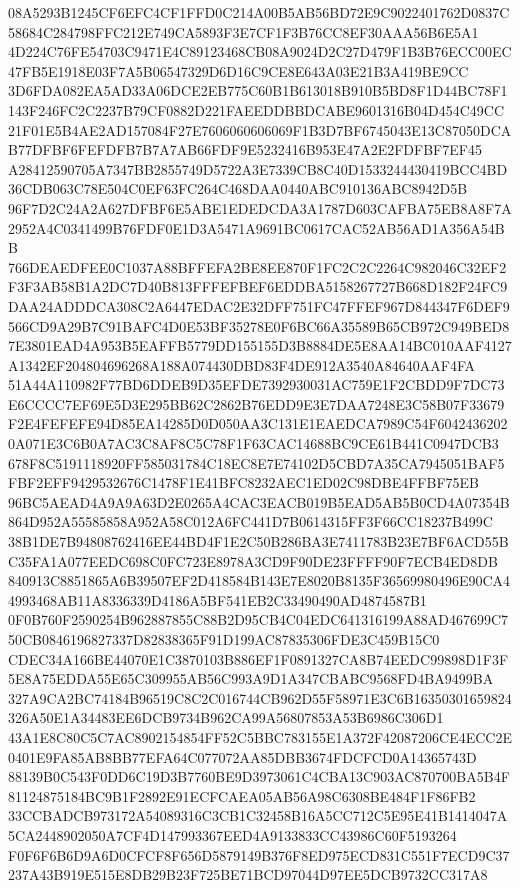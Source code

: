 \documentclass[UTF8,fontset=fandol,zihao=-4,a4paper]{ctexart}
\begin{document}
{{08A5293B1245CF6EFC4CF1FFD0C214A00B5AB56BD72E9C9022401762D0837C58684C284798FFC212E749CA5893F3E7CF1F3B76CC8EF30AAA56B6E5A1
4D224C76FE54703C9471E4C89123468CB08A9024D2C27D479F1B3B76ECC00EC47FB5E1918E03F7A5B06547329D6D16C9CE8E643A03E21B3A419BE9CC
3D6FDA082EA5AD33A06DCE2EB775C60B1B613018B910B5BD8F1D44BC78F1143F246FC2C2237B79CF0882D221FAEEDDBBDCABE9601316B04D454C49CC
21F01E5B4AE2AD157084F27E7606060606069F1B3D7BF6745043E13C87050DCAB77DFBF6FEFDFB7B7A7AB66FDF9E5232416B953E47A2E2FDFBF7EF45
A28412590705A7347BB2855749D5722A3E7339CB8C40D1533244430419BCC4BD36CDB063C78E504C0EF63FC264C468DAA0440ABC910136ABC8942D5B
96F7D2C24A2A627DFBF6E5ABE1EDEDCDA3A1787D603CAFBA75EB8A8F7A2952A4C0341499B76FDF0E1D3A5471A9691BC0617CAC52AB56AD1A356A54BB
766DEAEDFEE0C1037A88BFFEFA2BE8EE870F1FC2C2C2264C982046C32EF2F3F3AB58B1A2DC7D40B813FFFEFBEF6EDDBA5158267727B668D182F24FC9
DAA24ADDDCA308C2A6447EDAC2E32DFF751FC47FFEF967D844347F6DEF9566CD9A29B7C91BAFC4D0E53BF35278E0F6BC66A35589B65CB972C949BED8
7E3801EAD4A953B5EAFFB5779DD155155D3B8884DE5E8AA14BC010AAF4127A1342EF204804696268A188A074430DBD83F4DE912A3540A84640AAF4FA
51A44A110982F77BD6DDEB9D35EFDE7392930031AC759E1F2CBDD9F7DC73E6CCCC7EF69E5D3E295BB62C2862B76EDD9E3E7DAA7248E3C58B07F33679
F2E4FEFEFE94D85EA14285D0D050AA3C131E1EAEDCA7989C54F60424362020A071E3C6B0A7AC3C8AF8C5C78F1F63CAC14688BC9CE61B441C0947DCB3
678F8C5191118920FF585031784C18EC8E7E74102D5CBD7A35CA7945051BAF5FBF2EFF9429532676C1478F1E41BFC8232AEC1ED02C98DBE4FFBF75EB
96BC5AEAD4A9A9A63D2E0265A4CAC3EACB019B5EAD5AB5B0CD4A07354B864D952A55585858A952A58C012A6FC441D7B0614315FF3F66CC18237B499C
38B1DE7B94808762416EE44BD4F1E2C50B286BA3E7411783B23E7BF6ACD55BC35FA1A077EEDC698C0FC723E8978A3CD9F90DE23FFFF90F7ECB4ED8DB
840913C8851865A6B39507EF2D418584B143E7E8020B8135F36569980496E90CA44993468AB11A8336339D4186A5BF541EB2C33490490AD4874587B1
0F0B760F2590254B962887855C88B2D95CB4C04EDC641316199A88AD467699C750CB0846196827337D82838365F91D199AC87835306FDE3C459B15C0
CDEC34A166BE44070E1C3870103B886EF1F0891327CA8B74EEDC99898D1F3F5E8A75EDDA55E65C309955AB56C993A9D1A347CBABC9568FD4BA9499BA
327A9CA2BC74184B96519C8C2C016744CB962D55F58971E3C6B16350301659824326A50E1A34483EE6DCB9734B962CA99A56807853A53B6986C306D1
43A1E8C80C5C7AC8902154854FF52C5BBC783155E1A372F42087206CE4ECC2E0401E9FA85AB8BB77EFA64C077072AA85DBB3674FDCFCD0A14365743D
88139B0C543F0DD6C19D3B7760BE9D3973061C4CBA13C903AC870700BA5B4F81124875184BC9B1F2892E91ECFCAEA05AB56A98C6308BE484F1F86FB2
33CCBADCB973172A54089316C3CB1C32458B16A5CC712C5E95E41B1414047A5CA2448902050A7CF4D147993367EED4A9133833CC43986C60F5193264
F0F6F6B6D9A6D0CFCF8F656D5879149B376F8ED975ECD831C551F7ECD9C37237A43B919E515E8DB29B23F725BE71BCD97044D97EE5DCB9732CC317A8
}}
\end{document}

